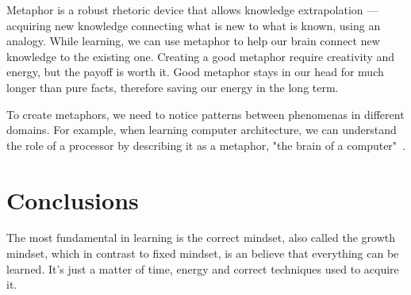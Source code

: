 \documentclass{article}
\begin{document}
Metaphor is a robust rhetoric device that allows knowledge extrapolation — acquiring new knowledge connecting what is new to what is known, using an analogy. While learning, we can use metaphor to help our brain connect new knowledge to the existing one. Creating a good metaphor require creativity and energy, but the payoff is worth it. Good metaphor stays in our head for much longer than pure facts, therefore saving our energy in the long term. 

To create metaphors, we need to notice patterns between phenomenas in different domains.  For example, when learning computer architecture, we can understand the role of a processor by describing it as a metaphor, "the brain of a computer"~\cite{radden2007cognitive}.

\section{Conclusions}

The most fundamental in learning is the correct mindset, also called the growth mindset, which in contrast to fixed mindset, is an believe that everything can be learned. It's just a matter of time, energy and correct techniques used to acquire it. 



\end{document}
